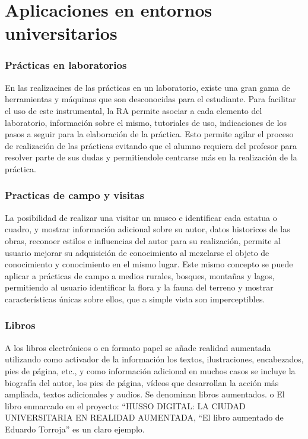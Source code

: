 \section{Aplicaciones en entornos universitarios}

\subsubsection{Prácticas en laboratorios} 
En las realizacines de las prácticas en un laboratorio, existe una gran gama de herramientas y máquinas que son desconocidas para el estudiante. Para facilitar el uso de este instrumental, la RA permite asociar a cada elemento del laboratorio, información sobre el mismo, tutoriales de uso, indicaciones de los pasos a seguir para la elaboración de la práctica. Esto permite agilar el proceso de realización de las prácticas evitando que el alumno requiera del profesor para resolver parte de sus dudas y permitiendole centrarse más en la realización de la práctica.

\subsubsection{Practicas de campo y visitas} 

La posibilidad de realizar una visitar un museo e identificar cada estatua o cuadro, y mostrar información adicional sobre su autor, datos historicos de las obras, reconoer estilos e influencias del autor para su realización, permite al usuario mejorar su adquisición de conocimiento al mezclarse el objeto de conocimiento y conocimiento en el mismo lugar. Este mismo concepto se puede aplicar a prácticas de campo a medios rurales, bosques, montañas y lagos, permitiendo al usuario identificar la flora y la fauna del terreno y mostrar características únicas sobre ellos, que a simple vista son imperceptibles.

\subsubsection{Libros}
A los libros electrónicos o en formato papel se añade realidad aumentada utilizando como activador de la información los textos, ilustraciones, encabezados, pies de página, etc., y como información adicional en muchos casos se incluye la biografía del autor, los pies de página, vídeos que desarrollan la acción más ampliada, textos adicionales y audios. Se denominan libros aumentados.
o El libro enmarcado en el proyecto: “HUSSO DIGITAL: LA CIUDAD UNIVERSITARIA EN REALIDAD AUMENTADA, “El libro aumentado de Eduardo Torroja” es un claro ejemplo.


